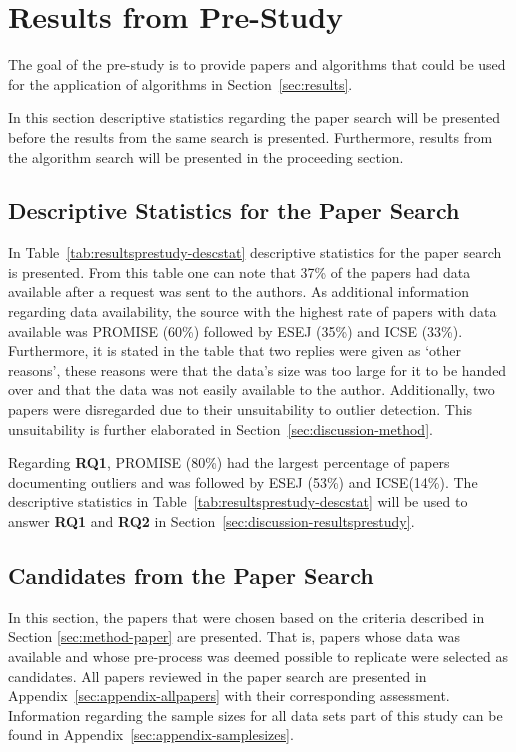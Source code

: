 ﻿\section{Results from Pre-Study}
\label{sec:resultsprestudy}
The goal of the pre-study is to provide papers and algorithms that could be used for the application of algorithms in Section~\ref{sec:results}.




In this section descriptive statistics regarding the paper search will be presented before the results from the same search is presented. Furthermore, results from the algorithm search will be presented in the proceeding section.




\subsection{Descriptive Statistics for the Paper Search}
\label{sec:resultsprestudy-descriptive}
In Table~\ref{tab:resultsprestudy-descstat} descriptive statistics for the paper search is presented. From this table one can note that 37\% of the papers had data available after a request was sent to the authors. As additional information regarding data availability, the source with the highest rate of papers with data available was PROMISE (60\%) followed by ESEJ (35\%) and ICSE (33\%).  Furthermore, it is stated in the table that two replies were given as `other reasons', these reasons were that the data's size was too large for it to be handed over and that the data was not easily available to the author. Additionally, two papers were disregarded due to their unsuitability to outlier detection. This unsuitability is further elaborated in Section~\ref{sec:discussion-method}. 




Regarding \textbf{RQ1}, PROMISE (80\%) had the largest percentage of papers documenting outliers and was followed by ESEJ (53\%) and ICSE(14\%). The descriptive statistics in Table~\ref{tab:resultsprestudy-descstat}  will be used to answer \textbf{RQ1} and \textbf{RQ2} in Section~\ref{sec:discussion-resultsprestudy}.







\subsection{Candidates from the Paper Search}
In this section, the papers that were chosen based on the criteria described in Section \ref{sec:method-paper} are presented. That is, papers whose data was available and whose pre-process was deemed possible to replicate were selected as candidates. All papers reviewed in the paper search are presented in Appendix~\ref{sec:appendix-allpapers} with their corresponding assessment. Information regarding the sample sizes for all data sets part of this study can be found in Appendix~\ref{sec:appendix-samplesizes}.


